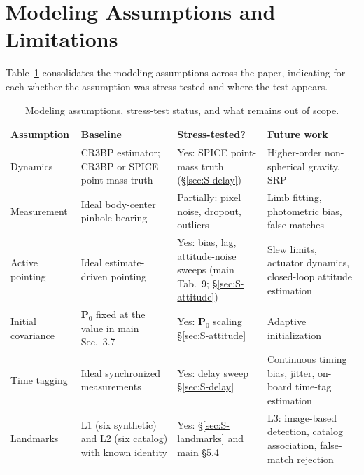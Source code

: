 \documentclass[10pt]{article}
\newcommand{\vect}[1]{\mathbf{#1}}
\begin{document}
\section{Modeling Assumptions and Limitations}
\label{sec:S-assumptions}
Table~\ref{tab:S-assumptions} consolidates the modeling assumptions across the paper, indicating for each whether the assumption was stress-tested and where the test appears.

\begin{table}[h]
\centering
\caption{Modeling assumptions, stress-test status, and what remains out of scope.}
\label{tab:S-assumptions}
\footnotesize
\begin{tabular}{@{}p{}p{}p{}p{}@{}}
\toprule
Assumption & Baseline & Stress-tested? & Future work \\
\midrule
Dynamics  & CR3BP estimator; CR3BP or SPICE point-mass truth & Yes: SPICE point-mass truth (\S\ref{sec:S-delay}) & Higher-order non-spherical gravity, SRP \\
Measurement & Ideal body-center pinhole bearing & Partially: pixel noise, dropout, outliers & Limb fitting, photometric bias, false matches \\
Active pointing & Ideal estimate-driven pointing & Yes: bias, lag, attitude-noise sweeps (main Tab.~9; \S\ref{sec:S-attitude}) & Slew limits, actuator dynamics, closed-loop attitude estimation \\
Initial covariance & $\vect{P}_0$ fixed at the value in main Sec.~3.7 & Yes: $\vect{P}_0$ scaling \S\ref{sec:S-attitude} & Adaptive initialization \\
Time tagging & Ideal synchronized measurements & Yes: delay sweep \S\ref{sec:S-delay} & Continuous timing bias, jitter, on-board time-tag estimation \\
Landmarks & L1 (six synthetic) and L2 (six catalog) with known identity & Yes: \S\ref{sec:S-landmarks} and main \S5.4 & L3: image-based detection, catalog association, false-match rejection \\
\bottomrule
\end{tabular}
\end{table}
\end{document}
